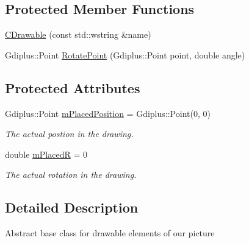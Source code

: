 \subsection*{Protected Member Functions}
\begin{DoxyCompactItemize}
\item 
\hyperlink{class_c_drawable_a2e153d7fd3a752139b0b87ea990a25fc}{C\+Drawable} (const std\+::wstring \&name)
\item 
Gdiplus\+::\+Point \hyperlink{class_c_drawable_aabf32ebc32a2dbe928bc9fa38bd82535}{Rotate\+Point} (Gdiplus\+::\+Point point, double angle)
\end{DoxyCompactItemize}
\subsection*{Protected Attributes}
\begin{DoxyCompactItemize}
\item 
\hypertarget{class_c_drawable_abafce2c99898aac71bdb99ec2031d3a5}{Gdiplus\+::\+Point \hyperlink{class_c_drawable_abafce2c99898aac71bdb99ec2031d3a5}{m\+Placed\+Position} = Gdiplus\+::\+Point(0, 0)}\label{class_c_drawable_abafce2c99898aac71bdb99ec2031d3a5}

\begin{DoxyCompactList}\small\item\em The actual postion in the drawing. \end{DoxyCompactList}\item 
\hypertarget{class_c_drawable_a3b280b16b1a4a8c6e2588b1dc5574bda}{double \hyperlink{class_c_drawable_a3b280b16b1a4a8c6e2588b1dc5574bda}{m\+Placed\+R} = 0}\label{class_c_drawable_a3b280b16b1a4a8c6e2588b1dc5574bda}

\begin{DoxyCompactList}\small\item\em The actual rotation in the drawing. \end{DoxyCompactList}\end{DoxyCompactItemize}


\subsection{Detailed Description}
Abstract base class for drawable elements of our picture 

